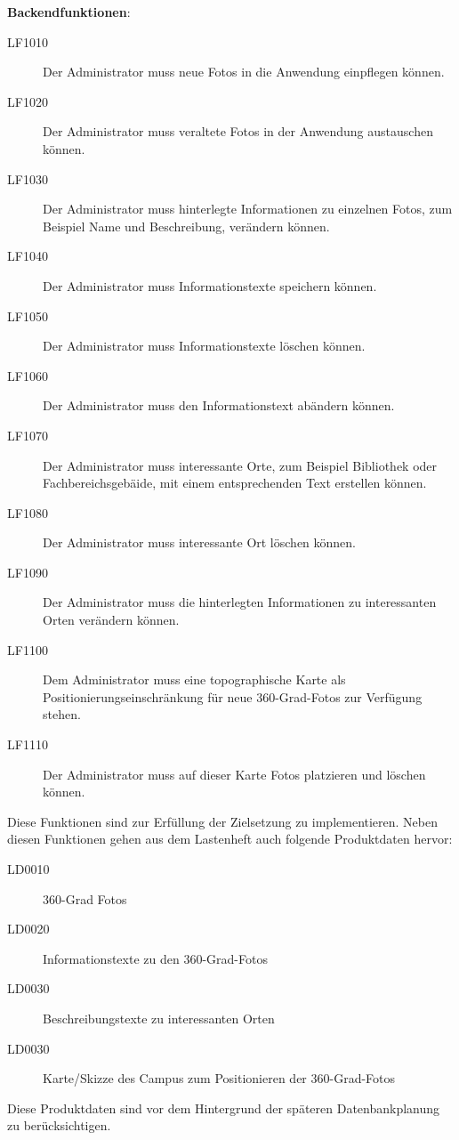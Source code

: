 \textbf{Backendfunktionen}:

\begin{description}
  \item[LF1010] Der Administrator muss neue Fotos in die Anwendung einpflegen können.
  \item[LF1020] Der Administrator muss veraltete Fotos in der Anwendung austauschen können.
  \item[LF1030] Der Administrator muss hinterlegte Informationen zu einzelnen Fotos, zum Beispiel Name und Beschreibung, verändern können.
  \item[LF1040] Der Administrator muss Informationstexte speichern können.
  \item[LF1050] Der Administrator muss Informationstexte löschen können.
  \item[LF1060] Der Administrator muss den Informationstext abändern können.
  \item[LF1070] Der Administrator muss interessante Orte, zum Beispiel Bibliothek oder Fachbereichsgebäide, mit einem entsprechenden Text erstellen können.
  \item[LF1080] Der Administrator muss interessante Ort löschen können.
  \item[LF1090] Der Administrator muss die hinterlegten Informationen zu interessanten Orten verändern können.
  \item[LF1100] Dem Administrator muss eine topographische Karte als Positionierungseinschränkung für neue
  360-Grad-Fotos zur Verfügung stehen.
  \item[LF1110] Der Administrator muss auf dieser Karte Fotos platzieren und löschen können.
\end{description}

Diese Funktionen sind zur Erfüllung der Zielsetzung zu implementieren. Neben diesen Funktionen gehen aus dem Lastenheft 
auch folgende Produktdaten hervor:

\begin{description}
  \item[LD0010] 360-Grad Fotos
  \item[LD0020] Informationstexte zu den 360-Grad-Fotos
  \item[LD0030] Beschreibungstexte zu interessanten Orten
  \item[LD0030] Karte/Skizze des Campus zum Positionieren der 360-Grad-Fotos
\end{description}

Diese Produktdaten sind vor dem Hintergrund der späteren Datenbankplanung zu berücksichtigen.